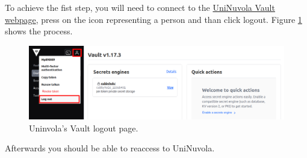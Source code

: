 To achieve the fist step, you will need to connect to the
\href{https://vault.uninuvola.unipg.it:8200/ui/vault/dashboard}{UniNuvola Vault webpage}, press on the icon representing
a person and than click logout. Figure \ref{img:logout} shows the process.      \\
\begin{figure}[!h]
    \center
    \includegraphics[width=0.8\linewidth]{img/vault.png}
    \caption{Uninvola's Vault logout page.}
    \label{img:logout}
\end{figure}

Afterwards you should be able to reaccess to UniNuvola.
